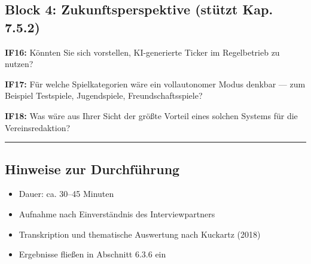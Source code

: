 \subsection{Block 4: Zukunftsperspektive (stützt Kap.
7.5.2)}\label{block-4-zukunftsperspektive-stuxfctzt-kap.-7.5.2}

\textbf{IF16:} Könnten Sie sich vorstellen, KI-generierte Ticker im
Regelbetrieb zu nutzen?

\textbf{IF17:} Für welche Spielkategorien wäre ein vollautonomer Modus
denkbar --- zum Beispiel Testspiele, Jugendspiele, Freundschaftsspiele?

\textbf{IF18:} Was wäre aus Ihrer Sicht der größte Vorteil eines solchen
Systems für die Vereinsredaktion?

\begin{center}\rule{0.5\linewidth}{0.5pt}\end{center}

\subsection{Hinweise zur
Durchführung}\label{hinweise-zur-durchfuxfchrung}

\begin{itemize}
\tightlist
\item
  Dauer: ca. 30--45 Minuten
\item
  Aufnahme nach Einverständnis des Interviewpartners
\item
  Transkription und thematische Auswertung nach Kuckartz (2018)
\item
  Ergebnisse fließen in Abschnitt 6.3.6 ein
\end{itemize}
